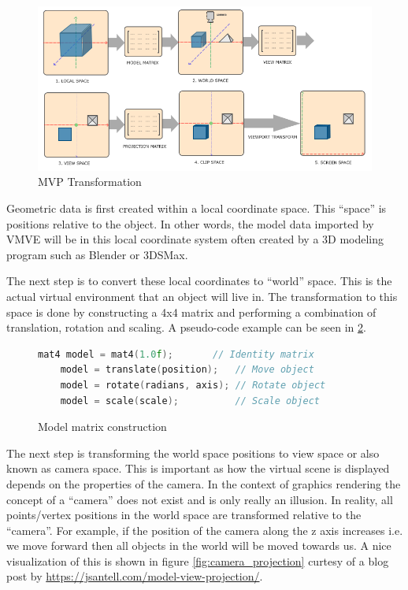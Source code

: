 \documentclass[11pt]{article}
\begin{document}
\begin{figure}[h!]
  \centering
  \includegraphics[width=\textwidth]{images/mvp.png}
  \caption{MVP Transformation \cite{coordinate_systems}}
  \label{fig:mvp_transformation} 
\end{figure}

Geometric data is first created within a local coordinate space. This ``space''
is positions relative to the object. In other words, the model data imported by
VMVE will be in this local coordinate system often created by a 3D modeling
program such as Blender or 3DSMax.

The next step is to convert these local coordinates to ``world'' space. This is
the actual virtual environment that an object will live in. The transformation
to this space is done by constructing a 4x4 matrix and performing a combination
of translation, rotation and scaling. A pseudo-code example can be seen in
\ref{fig:local_to_world}.

\begin{figure}[ht]
  \centering
  \begin{lstlisting}[language=C++]
    mat4 model = mat4(1.0f);       // Identity matrix
    model = translate(position);   // Move object
    model = rotate(radians, axis); // Rotate object
    model = scale(scale);          // Scale object
  \end{lstlisting}
  \caption{Model matrix construction}
  \label{fig:local_to_world}
\end{figure}
  

The next step is transforming the world space positions to view space or also
known as camera space. This is important as how the virtual scene is displayed
depends on the properties of the camera. In the context of graphics rendering
the concept of a ``camera'' does not exist and is only really an illusion. In
reality, all points/vertex positions in the world space are transformed relative
to the ``camera''. For example, if the position of the camera along the z axis
increases i.e. we move forward then all objects in the world will be moved
towards us. A nice visualization of this is shown in figure
\ref{fig:camera_projection} curtesy of a blog post by \href{Jordan
Santell}{https://jsantell.com/model-view-projection/}.
\end{document}
